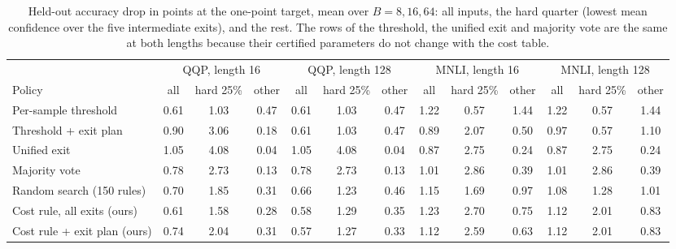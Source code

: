 \begin{table}[ht]
  \centering\scriptsize\setlength{\tabcolsep}{3pt}
  \begin{tabular}{@{}lcccccccccccc@{}}
    \toprule
    & \multicolumn{3}{c}{QQP, length 16} & \multicolumn{3}{c}{QQP, length 128} & \multicolumn{3}{c}{MNLI, length 16} & \multicolumn{3}{c}{MNLI, length 128} \\
    \cmidrule(lr){2-4}\cmidrule(lr){5-7}\cmidrule(lr){8-10}\cmidrule(lr){11-13}
    Policy & all & hard 25\% & other & all & hard 25\% & other & all & hard 25\% & other & all & hard 25\% & other \\
    \midrule
    Per-sample threshold         & 0.61 & 1.03 & 0.47 & 0.61 & 1.03 & 0.47 & 1.22 & 0.57 & 1.44 & 1.22 & 0.57 & 1.44 \\
    Threshold + exit plan        & 0.90 & 3.06 & 0.18 & 0.61 & 1.03 & 0.47 & 0.89 & 2.07 & 0.50 & 0.97 & 0.57 & 1.10 \\
    Unified exit                 & 1.05 & 4.08 & 0.04 & 1.05 & 4.08 & 0.04 & 0.87 & 2.75 & 0.24 & 0.87 & 2.75 & 0.24 \\
    Majority vote                & 0.78 & 2.73 & 0.13 & 0.78 & 2.73 & 0.13 & 1.01 & 2.86 & 0.39 & 1.01 & 2.86 & 0.39 \\
    Random search (150 rules)    & 0.70 & 1.85 & 0.31 & 0.66 & 1.23 & 0.46 & 1.15 & 1.69 & 0.97 & 1.08 & 1.28 & 1.01 \\
    Cost rule, all exits (ours)  & 0.61 & 1.58 & 0.28 & 0.58 & 1.29 & 0.35 & 1.23 & 2.70 & 0.75 & 1.12 & 2.01 & 0.83 \\
    Cost rule + exit plan (ours) & 0.74 & 2.04 & 0.31 & 0.57 & 1.27 & 0.33 & 1.12 & 2.59 & 0.63 & 1.12 & 2.01 & 0.83 \\
    \bottomrule
  \end{tabular}
  \caption{Held-out accuracy drop in points at the one-point target, mean over $B=8,16,64$: all inputs, the hard
  quarter (lowest mean confidence over the five intermediate exits), and the rest. The rows of the threshold, the
  unified exit and majority vote are the same at both lengths because their certified parameters do not change with
  the cost table.}
  \label{tab:hard}
\end{table}

